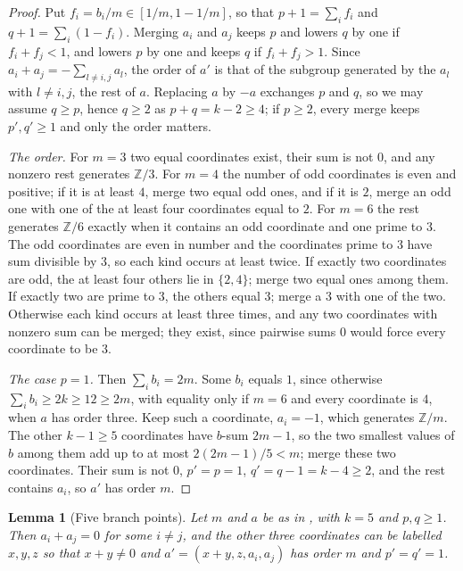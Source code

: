 \documentclass[11pt,reqno]{amsart}
\theoremstyle{plain}
\newtheorem{lemma}[theorem]{Lemma}
\theoremstyle{definition}
\theoremstyle{remark}
\newcommand{\ZZ}{\mathbb{Z}}
\begin{document}
\begin{proof}
Put $f_{i}=b_{i}/m\in[1/m,1-1/m]$, so that $p+1=\sum_{i}f_{i}$ and
$q+1=\sum_{i}(1-f_{i})$. Merging $a_{i}$ and $a_{j}$ keeps $p$ and lowers $q$
by one if $f_{i}+f_{j}<1$, and lowers $p$ by one and keeps $q$ if
$f_{i}+f_{j}>1$. Since $a_{i}+a_{j}=-\sum_{l\ne i,j}a_{l}$, the order of $a'$ is
that of the subgroup generated by the $a_{l}$ with $l\ne i,j$, the rest of
$a$. Replacing $a$ by $-a$ exchanges $p$ and $q$, so we may assume $q\ge p$,
hence $q\ge2$ as $p+q=k-2\ge4$; if $p\ge2$, every merge keeps $p',q'\ge1$
and only the order matters.

\emph{The order.} For $m=3$ two equal coordinates exist, their sum is not
$0$, and any nonzero rest generates $\ZZ/3$. For $m=4$ the number of odd
coordinates is even and positive; if it is at least $4$, merge two equal odd
ones, and if it is $2$, merge an odd one with one of the at least four
coordinates equal to $2$. For $m=6$ the rest generates $\ZZ/6$ exactly when
it contains an odd coordinate and one prime to $3$. The odd coordinates
are even in number and the coordinates prime to $3$ have sum divisible by
$3$, so each kind occurs at least twice. If exactly two coordinates are
odd, the at least four others lie in $\{2,4\}$; merge two equal ones among
them. If exactly two are prime to $3$, the others equal $3$; merge a $3$
with one of the two. Otherwise each kind occurs at least three times, and
any two coordinates with nonzero sum can be merged; they exist, since
pairwise sums $0$ would force every coordinate to be $3$.

\emph{The case $p=1$.} Then $\sum_{i}b_{i}=2m$. Some $b_{i}$ equals $1$,
since otherwise $\sum_{i}b_{i}\ge2k\ge12\ge2m$, with equality only if $m=6$
and every coordinate is $4$, when $a$ has order three. Keep such a coordinate,
$a_{i}=-1$, which generates $\ZZ/m$. The other $k-1\ge5$ coordinates have
$b$-sum $2m-1$, so the two smallest values of $b$ among them add up to at most
$2(2m-1)/5<m$; merge these two coordinates. Their sum is not $0$, $p'=p=1$,
$q'=q-1=k-4\ge2$, and the rest contains $a_{i}$, so $a'$ has order $m$.
\end{proof}

\begin{lemma}[Five branch points]\label{lem:mergefive}
Let $m$ and $a$ be as in , with $k=5$ and $p,q\ge1$. Then
$a_{i}+a_{j}=0$ for some $i\ne j$, and the other three coordinates can be
labelled $x,y,z$ so that $x+y\ne0$ and $a'=(x+y,z,a_{i},a_{j})$ has order $m$
and $p'=q'=1$.
\end{lemma}
\end{document}
